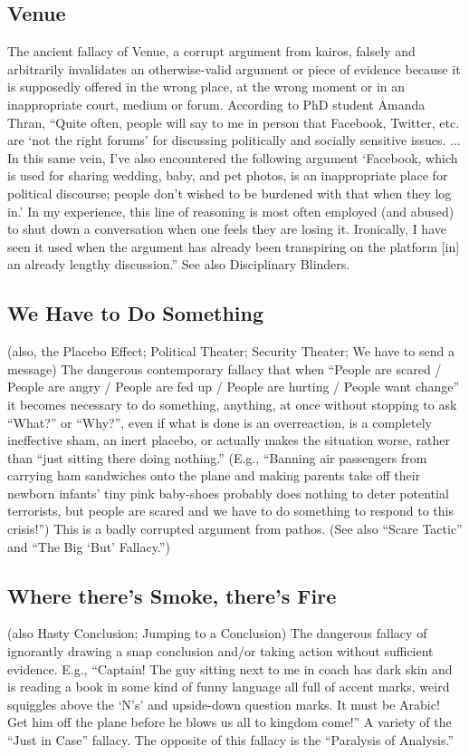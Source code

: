 \documentclass[10pt,a4paper,british]{article}
\begin{document}
\begin{multicols}{2}
	\subsection{Venue} The ancient fallacy of Venue, a corrupt argument from
	kairos, falsely and arbitrarily invalidates an otherwise{-}valid argument
	or piece of evidence because it is supposedly offered in the wrong place,
	at the wrong moment or in an inappropriate court, medium or forum.
	According to PhD student Amanda Thran, ``Quite often, people will say to me
	in person that Facebook, Twitter, etc. are `not the right forums' for
	discussing politically and socially sensitive issues. ... In this same
	vein, I’ve also encountered the following argument `Facebook, which is used
	for sharing wedding, baby, and pet photos, is an inappropriate place for
	political discourse; people don’t wished to be burdened with that when they
	log in.' In my experience, this line of reasoning is most often employed
	(and abused) to shut down a conversation when one feels they are losing it.
	Ironically, I have seen it used when the argument has already been
	transpiring on the platform [in] an already lengthy discussion.'' See also
	Disciplinary Blinders.

    \subsection{We Have to Do Something} (also,  the Placebo Effect; Political
    Theater; Security Theater; We have to send a message) The dangerous
    contemporary fallacy that when ``People are scared / People are angry /
    People are fed up / People are hurting / People want change'' it becomes
    necessary to do something, anything, at once without stopping to ask
    ``What?'' or ``Why?'', even if what is done is an overreaction, is a
    completely ineffective sham, an inert placebo, or actually makes the
    situation worse, rather than ``just sitting there doing nothing.'' (E.g.,
    ``Banning air passengers from carrying ham sandwiches onto the plane and
    making parents take off their newborn infants' tiny pink baby{-}shoes
    probably does nothing to deter potential terrorists, but people are scared
    and we have to do something to respond to this crisis!'') This is a badly
    corrupted argument from pathos. (See also ``Scare Tactic'' and ``The Big
    `But' Fallacy.'')

    \subsection{Where there’s Smoke, there’s Fire} (also Hasty Conclusion; Jumping
    to a Conclusion) The dangerous fallacy of ignorantly drawing a snap
    conclusion and/or taking action without sufficient evidence. E.g.,
    “Captain! The guy sitting next to me in coach has dark skin and is reading
    a book in some kind of funny language all full of accent marks, weird
    squiggles above the `N's' and upside{-}down question marks. It must be
    Arabic! Get him off the plane before he blows us all to kingdom come!” A
    variety of the “Just in Case” fallacy. The opposite of this fallacy is the
    ``Paralysis of Analysis.'' 


\end{multicols}
\end{document}
